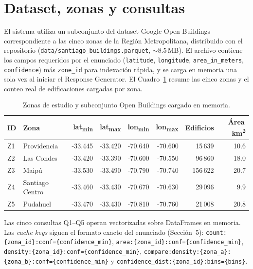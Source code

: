 \documentclass[11pt,a4paper]{article}
\begin{document}
\section{Dataset, zonas y consultas}

El sistema utiliza un subconjunto del dataset Google Open Buildings
correspondiente a las cinco zonas de la Región Metropolitana, distribuido
con el repositorio (\texttt{data/santiago_buildings.parquet},
$\sim$8.5\,MB). El archivo contiene los campos requeridos por el
enunciado (\texttt{latitude}, \texttt{longitude}, \texttt{area\_in\_meters},
\texttt{confidence}) más \texttt{zone\_id} para indexación rápida, y se
carga en memoria una sola vez al iniciar el Response Generator. El
Cuadro~\ref{tab:zones} resume las cinco zonas y el conteo real de
edificaciones cargadas por zona.

\begin{table}[h]
\centering\small
\begin{tabular}{llrrrrrr}
\toprule
\textbf{ID} & \textbf{Zona} & \textbf{lat\textsubscript{min}} &
\textbf{lat\textsubscript{max}} & \textbf{lon\textsubscript{min}} &
\textbf{lon\textsubscript{max}} & \textbf{Edificios} & \textbf{Área\,km\textsuperscript{2}} \\
\midrule
Z1 & Providencia    & -33.445 & -33.420 & -70.640 & -70.600 &  15\,639 & 10.6 \\
Z2 & Las Condes     & -33.420 & -33.390 & -70.600 & -70.550 &  96\,860 & 18.0 \\
Z3 & Maipú          & -33.530 & -33.490 & -70.790 & -70.740 & 156\,622 & 20.7 \\
Z4 & Santiago Centro& -33.460 & -33.430 & -70.670 & -70.630 &  29\,096 &  9.9 \\
Z5 & Pudahuel       & -33.470 & -33.430 & -70.810 & -70.760 &  21\,008 & 20.8 \\
\bottomrule
\end{tabular}
\caption{Zonas de estudio y subconjunto Open Buildings cargado en memoria.}
\label{tab:zones}
\end{table}

Las cinco consultas Q1--Q5 operan vectorizadas sobre DataFrames en memoria.
Las \textit{cache keys} siguen el formato exacto del enunciado (Sección~5):
\texttt{count:\{zona\_id\}:conf=\{confidence\_min\}},
\texttt{area:\{zona\_id\}:conf=\{confidence\_min\}},
\texttt{density:\{zona\_id\}:conf=\{confidence\_min\}},
\texttt{compare:density:\{zona\_a\}:\{zona\_b\}:conf=\{confidence\_min\}} y
\texttt{confidence\_dist:\{zona\_id\}:bins=\{bins\}}.
\end{document}
